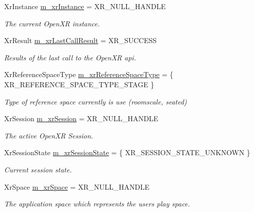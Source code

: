 \begin{DoxyCompactItemize}
Xr\+Instance \mbox{\hyperlink{class_open_x_r_provider_1_1_x_r_provider_a9e1f2a85f900c81ee109c134b609a80d}{m\+\_\+xr\+Instance}} = X\+R\+\_\+\+N\+U\+L\+L\+\_\+\+H\+A\+N\+D\+LE
\begin{DoxyCompactList}\small\item\em The current Open\+XR instance. \end{DoxyCompactList}\item 
Xr\+Result \mbox{\hyperlink{class_open_x_r_provider_1_1_x_r_provider_a40f1a70863c7eec9a1d80f458a2f828a}{m\+\_\+xr\+Last\+Call\+Result}} = X\+R\+\_\+\+S\+U\+C\+C\+E\+SS
\begin{DoxyCompactList}\small\item\em Results of the last call to the Open\+XR api. \end{DoxyCompactList}\item 
Xr\+Reference\+Space\+Type \mbox{\hyperlink{class_open_x_r_provider_1_1_x_r_provider_a2d52dc8b79eca6fb9a61ac5f74520107}{m\+\_\+xr\+Reference\+Space\+Type}} = \{ X\+R\+\_\+\+R\+E\+F\+E\+R\+E\+N\+C\+E\+\_\+\+S\+P\+A\+C\+E\+\_\+\+T\+Y\+P\+E\+\_\+\+S\+T\+A\+GE \}
\begin{DoxyCompactList}\small\item\em Type of reference space currently is use (roomscale, seated) \end{DoxyCompactList}\item 
Xr\+Session \mbox{\hyperlink{class_open_x_r_provider_1_1_x_r_provider_a7f982aef09ccb7e7774168dafcfee1ce}{m\+\_\+xr\+Session}} = X\+R\+\_\+\+N\+U\+L\+L\+\_\+\+H\+A\+N\+D\+LE
\begin{DoxyCompactList}\small\item\em The active Open\+XR Session. \end{DoxyCompactList}\item 
Xr\+Session\+State \mbox{\hyperlink{class_open_x_r_provider_1_1_x_r_provider_a73f18afafd90dd8460f5f9ecc4d7f234}{m\+\_\+xr\+Session\+State}} = \{ X\+R\+\_\+\+S\+E\+S\+S\+I\+O\+N\+\_\+\+S\+T\+A\+T\+E\+\_\+\+U\+N\+K\+N\+O\+WN \}
\begin{DoxyCompactList}\small\item\em Current session state. \end{DoxyCompactList}\item 
Xr\+Space \mbox{\hyperlink{class_open_x_r_provider_1_1_x_r_provider_a1e442b83ade02dc6341d586779086049}{m\+\_\+xr\+Space}} = X\+R\+\_\+\+N\+U\+L\+L\+\_\+\+H\+A\+N\+D\+LE
\begin{DoxyCompactList}\small\item\em The application space which represents the user\textquotesingle{}s play space. \end{DoxyCompactList}\item 

\end{DoxyCompactItemize}
